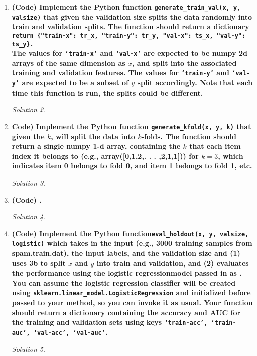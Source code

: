 \documentclass[a4paper,12pt]{article}
\theoremstyle{definition}
\theoremstyle{remark}
\newtheorem*{solution}{Solution}
\begin{document}
\begin{enumerate}
\begin{enumerate}
\begin{solution}
			\end{solution}
			\item {\bf (Code) Implement the Python function \texttt{generate\_train\_val(x, y, valsize)} that given the validation size splits the data randomly into train and validation splits. The function should return a dictionary \\
				\texttt{return \{"train-x": tr\_x, "train-y": tr\_y, "val-x": ts\_x, "val-y": ts\_y\}.}\\ 
				The values for \texttt{‘train-x’} and \texttt{‘val-x’} are expected to be numpy 2d arrays of the same dimension as $x$, and split into the associated training and validation features. The values for \texttt{‘train-y’} and \texttt{‘val-y’} are expected to be a subset
				of $y$ split accordingly. Note that each time this function is run, the splits could be different.}
			\begin{solution}
			
			\end{solution}
			\item {\bf Code) Implement the Python function \texttt{generate\_kfold(x, y, k)} that given the $k$, will split the data into $k$-folds. The function should return a single numpy 1-d array, containing the $k$ that each item index it belongs to (e.g., array([0,1,2,. . . ,2,1,1])) for $k=3$, which indicates item 0 belongs to fold 0, and item 1 belongs to fold 1, etc.}
			\begin{solution}
			
			\end{solution}
			\item {\bf(Code) .}
			\begin{solution}
				
			\end{solution}
			\item {\bf (Code) Implement the Python function\texttt{eval\_holdout(x, y, valsize, logistic)} which takes in the input (e.g., 3000 training samples from spam.train.dat), the input labels, and the validation size and (1) uses 3b to split $x$ and $y$ into train and validation, and (2) evaluates the performance using the logistic regressionmodel passed in as . You can assume the logistic regression classifier will be created using \texttt{sklearn.linear\_model.LogisticRegression} and initialized before passed to your method, so you can invoke it as usual. Your function should return a dictionary containing the accuracy and AUC for the training and validation sets using keys \texttt{‘train-acc’, ‘train-auc’, ‘val-acc’, ‘val-auc’}.}
			\begin{solution}
				

\end{solution}
\end{enumerate}
\end{enumerate}
\end{document}
